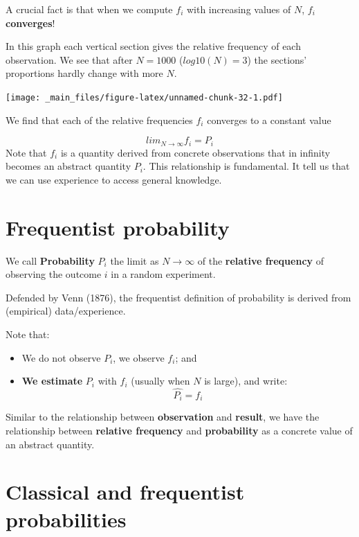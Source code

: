 \documentclass[
]{book}
\providecommand{\tightlist}{%
  \setlength{\itemsep}{0pt}\setlength{\parskip}{0pt}}
\begin{document}
A crucial fact is that when we compute \(f_i\) with increasing values of \(N\), \(f_i\) \textbf{converges}!

In this graph each vertical section gives the relative frequency of each observation. We see that after \(N=1000\) (\(log10(N)=3\)) the sections' proportions hardly change with more \(N\).

\texttt{[image: \_main\_files/figure-latex/unnamed-chunk-32-1.pdf]}

We find that each of the relative frequencies \(f_i\) converges to a constant value

\[lim_{N\rightarrow \infty} f_i = P_i\]
Note that \(f_i\) is a quantity derived from concrete observations that in infinity becomes an abstract quantity \(P_i\). This relationship is fundamental. It tell us that we can use experience to access general knowledge.

\hypertarget{frequentist-probability}{%
\section{Frequentist probability}\label{frequentist-probability}}

We call \textbf{Probability} \(P_i\) the limit as \(N \rightarrow \infty\) of the \textbf{relative frequency} of observing the outcome \(i\) in a random experiment.

Defended by Venn (1876), the frequentist definition of probability is derived from (empirical) data/experience.

Note that:

\begin{itemize}
\tightlist
\item
  We do not observe \(P_i\), we observe \(f_i\); and
\item
  \textbf{We estimate} \(P_i\) with \(f_i\) (usually when \(N\) is large), and write: \[\hat {P_ i}= f_i\]
\end{itemize}

Similar to the relationship between \textbf{observation} and \textbf{result}, we have the relationship between \textbf{relative frequency} and \textbf{probability} as a concrete value of an abstract quantity.

\hypertarget{classical-and-frequentist-probabilities}{%
\section{Classical and frequentist probabilities}\label{classical-and-frequentist-probabilities}}
\end{document}
